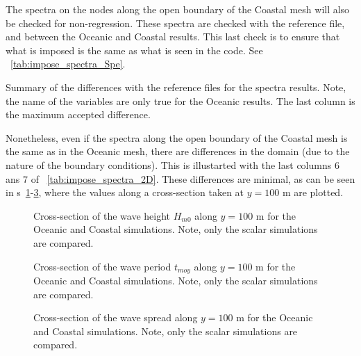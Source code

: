 The spectra on the nodes along the open boundary of the Coastal mesh will also be checked for
non-regression. These spectra are checked with the reference file, and between the Oceanic and Coastal
results. This last check is to ensure that what is imposed is the same as what is seen in the code.
See \tablename~\ref{tab:impose_spectra_Spe}.

%
\begin{table}[H]
\begin{center}
%
\small
%
\caption{Summary of the differences with the reference files for the spectra results. Note, the name of
the variables are only true for the Oceanic results. The last column is the maximum accepted difference.}
\label{tab:impose_spectra_Spe}
%
%
%
\end{center}
\end{table}
%

Nonetheless, even if the spectra along the open boundary of the Coastal mesh is the same as in the
Oceanic mesh, there are differences in the domain (due to the nature of the boundary conditions).
This is illustarted with the last columns $6$ ans $7$ of \tablename~\ref{tab:impose_spectra_2D}. These
differences are minimal, as can be seen in
\figurename{}s~\ref{fig:impose_spectra_Hm0}-\ref{fig:impose_spectra_WSpread}, where the values along
a cross-section taken at $y=100$ m are plotted.

\begin{figure}[H]
\begin{center}
\end{center}
\caption{Cross-section of the wave height $H_{m0}$ along $y=100$ m for the Oceanic and Coastal
simulations. Note, only the scalar simulations are compared.}
\label{fig:impose_spectra_Hm0}
\end{figure}

\vfill\mbox{}

\begin{figure}[H]
\begin{center}
\end{center}
\caption{Cross-section of the wave period $t_{moy}$ along $y=100$ m for the Oceanic and Coastal
simulations. Note, only the scalar simulations are compared.}
\label{fig:impose_spectra_Tmoy}
\end{figure}

\begin{figure}[H]
\begin{center}
\end{center}
\caption{Cross-section of the wave spread along $y=100$ m for the Oceanic and Coastal simulations.
Note, only the scalar simulations are compared.}
\label{fig:impose_spectra_WSpread}
\end{figure}



